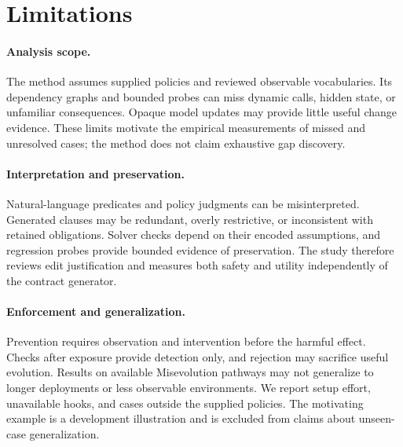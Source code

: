 \section{Limitations}
\paragraph{Analysis scope.}
The method assumes supplied policies and reviewed observable vocabularies. Its dependency graphs and bounded probes can miss dynamic calls, hidden state, or unfamiliar consequences. Opaque model updates may provide little useful change evidence. These limits motivate the empirical measurements of missed and unresolved cases; the method does not claim exhaustive gap discovery.

\paragraph{Interpretation and preservation.}
Natural-language predicates and policy judgments can be misinterpreted. Generated clauses may be redundant, overly restrictive, or inconsistent with retained obligations. Solver checks depend on their encoded assumptions, and regression probes provide bounded evidence of preservation. The study therefore reviews edit justification and measures both safety and utility independently of the contract generator.

\paragraph{Enforcement and generalization.}
Prevention requires observation and intervention before the harmful effect. Checks after exposure provide detection only, and rejection may sacrifice useful evolution. Results on available Misevolution pathways may not generalize to longer deployments or less observable environments. We report setup effort, unavailable hooks, and cases outside the supplied policies. The motivating example is a development illustration and is excluded from claims about unseen-case generalization.

